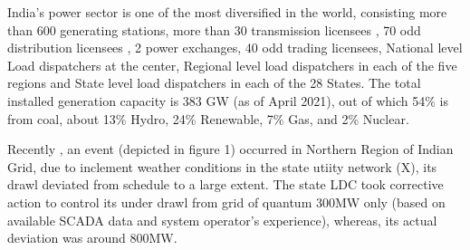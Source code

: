 \documentclass[conference]{IEEEtran}
\begin{document}
India's power sector is one of the most diversified in the world,  consisting more than 600 generating stations, more than 30 transmission licensees , 70 odd distribution licensees , 2 power exchanges, 40 odd trading licensees, National level Load dispatchers at the center, Regional level load dispatchers in  each of the five regions and State level load dispatchers in each of the 28 States. The total installed generation capacity is 383 GW (as of April 2021), out of which 54\% is from coal, about 13\% Hydro, 24\% Renewable, 7\% Gas, and 2\% Nuclear.\\

Recently , an event (depicted in figure 1) occurred in Northern Region of Indian Grid, due to inclement weather conditions in the state utiity network (X), its drawl deviated from schedule to a large extent. The state LDC took corrective action to control its under drawl from grid of quantum 300MW only (based on available SCADA data and system operator's experience), whereas, its actual deviation was around 800MW.\\
\end{document}
